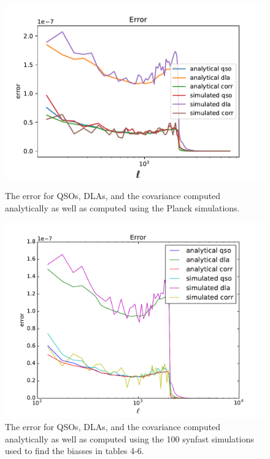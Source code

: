 \documentclass{amsart}
\begin{document}
\begin{figure}
  \includegraphics[width=\linewidth]{error_both.pdf}
  \caption{The error for QSOs, DLAs, and the covariance computed analytically as well as computed using the Planck simulations.}
  \label{fig:error}

  \includegraphics[width=\linewidth]{error_both_syn.pdf}
  \caption{The error for QSOs, DLAs, and the covariance computed analytically as well as computed using the 100 synfast simulations used to find the biasses in tables 4-6.}
  \label{fig:errorsyn}
\end{figure}
\end{document}
